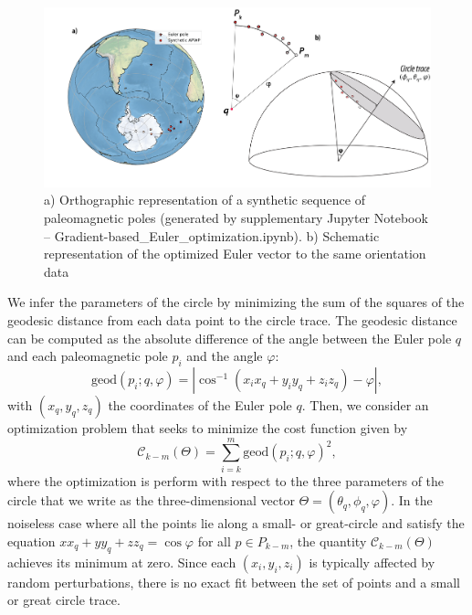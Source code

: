 \documentclass{article} %
\begin{document}
\begin{figure}
\begin{centering}
\includegraphics[scale=0.5]{Figure 2.png}

\caption{\small a) Orthographic representation of a synthetic sequence of paleomagnetic poles (generated by supplementary Jupyter Notebook -- Gradient-based\_Euler\_optimization.ipynb). b) Schematic representation of the optimized Euler vector to the same orientation data}

\label{fig:circle_fitting}
\end{centering}
\end{figure}

We infer the parameters of the circle by minimizing the sum of the squares of the geodesic distance from each data point to the circle trace. The geodesic distance can be computed as the absolute difference of the angle between the Euler pole $q$ and each paleomagnetic pole $p_i$ and the angle $\varphi$:
\begin{equation}
    \text{geod}(p_i; q, \varphi) = \left | \cos^{-1}(x_i x_q  + y_i y_q + z_i z_q) - \varphi  \right |,
\end{equation}
with $(x_q, y_q, z_q)$ the coordinates of the Euler pole $q$.
Then, we consider an optimization problem that seeks to minimize the cost function given by 
\begin{equation}
    \mathcal C_{k-m} (\Theta) = \sum_{i=k}^{m} \text{geod}(p_i; q, \varphi )^2,
    \label{costfunction}
\end{equation}
where the optimization is perform with respect to the three parameters of the circle that we write as the three-dimensional vector $\Theta = (\theta_q, \phi_q,  \varphi )$. In the noiseless case where all the points lie along a small- or great-circle and satisfy the equation $x x_q + y y_q + z z_q = \cos \varphi$ for all $p \in P_{k-m}$, the quantity $\mathcal{C}_{k-m}(\Theta)$ achieves its minimum at zero. Since each $(x_i, y_i, z_i)$ is typically affected by random perturbations, there is no exact fit between the set of points and a small or great circle trace.  
\end{document}
